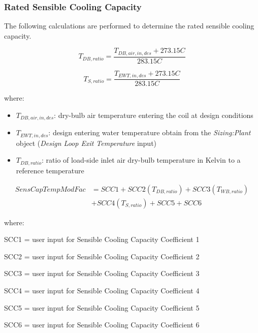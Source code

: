 \subsubsection{Rated Sensible Cooling Capacity}\label{rated-sensible-cooling-capacity}

The following calculations are performed to determine the rated sensible cooling capacity.

\begin{equation}
  T_{DB,ratio} = \frac{T_{DB,air,in,des}+273.15C}{283.15C}
\end{equation}

\begin{equation}
  T_{S,ratio} = \frac{T_{EWT,in,des}+273.15C}{283.15C}
\end{equation}

where:

\begin{itemize}
\item $T_{DB,air,in,des}$: dry-bulb air temperature entering the coil at design conditions
\item $T_{EWT,in,des}$: design entering water temperature obtain from the \emph{Sizing:Plant} object (\emph{Design Loop Exit Temperature} input)
\item $T_{DB,ratio}$: ratio of load-side inlet air dry-bulb temperature in Kelvin to a reference temperature
\end{itemize}

\begin{equation}
  \begin{array}{rl}
    SensCapTempModFac &= SCC1 + SCC2\left( {{T_{DB,ratio}}} \right) + SCC3\left( {{T_{WB,ratio}}} \right) \\
                      &+ SCC4\left( {{T_{S,ratio}}} \right) + SCC5 + SCC6
  \end{array}
\end{equation}

where:

SCC1 = user input for Sensible Cooling Capacity Coefficient 1

SCC2 = user input for Sensible Cooling Capacity Coefficient 2

SCC3 = user input for Sensible Cooling Capacity Coefficient 3

SCC4 = user input for Sensible Cooling Capacity Coefficient 4

SCC5 = user input for Sensible Cooling Capacity Coefficient 5

SCC6 = user input for Sensible Cooling Capacity Coefficient 6



